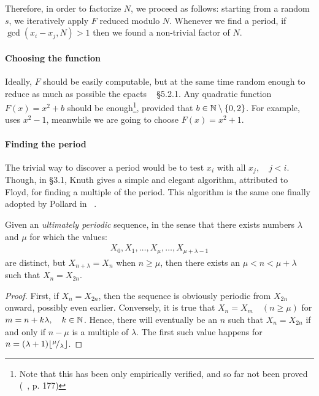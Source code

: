 Therefore, in order to factorize $N$, we proceed as follows: starting from a
random $s$, we iteratively apply $F$ reduced modulo $N$. Whenever we find a
period, if $\gcd(x_i - x_j, N) > 1$ then we found a non-trivial
factor of $N$.

\paragraph{Choosing the function} Ideally, $F$ should be easily computable, but
at the same time random enough to reduce as much as possible the epacts
~\cite{Crandall} \S 5.2.1. Any quadratic function $F(x) = x^2 + b$ should be
enough\footnote{
  Note that this has been only empirically verified, and so far not been proved
  (~\cite{riesel}, p. 177)},
provided that $b \in \mathbb{N} \setminus \{0, 2\}$.
For example, ~\cite{pollardMC} uses $x^2 -1$, meanwhile we are going to choose
$F(x) = x^2 + 1$.

\paragraph{Finding the period} The trivial way to discover a period would be to
test $x_i$ with all $x_j, \quad j < i$. Though, in \cite{AOCPv2} \S 3.1,
Knuth gives a simple and elegant algorithm, attributed to Floyd, for finding a
multiple of the period.
This algorithm is the same one finally adopted by Pollard in
~\cite{pollardMC}.

\begin{theorem*}[Floyd]
Given an \emph{ultimately periodic} sequence, in the sense that there exists
numbers $\lambda$ and $\mu$ for which the values:
\begin{align*}
  X_0, X_1, \ldots, X_{\mu}, \ldots, X_{\mu + \lambda - 1}
\end{align*}
are distinct, but $X_{n+\lambda} = X_n$ when $n \geq \mu$,
then there exists an
$\mu < n < \mu + \lambda$ such that $X_n = X_{2n}$.
\end{theorem*}

\begin{proof}
  First, if $X_n = X_{2n}$, then the sequence is obviously periodic from
  $X_{2n}$ onward, possibly even earlier.
  Conversely, it is true that $X_n = X_m \quad (n \geq \mu)$ for
  $m = n + k\lambda, \quad k \in \mathbb{N}$. Hence, there will eventually
  be an $n$ such that $X_n = X_{2n}$ if and only if $n - \mu$ is a multiple of
  $\lambda$.
  The first such value happens for $n = (\lambda + 1)\lfloor{}^{\mu}\!/_{\lambda}\rfloor$.
\end{proof}

